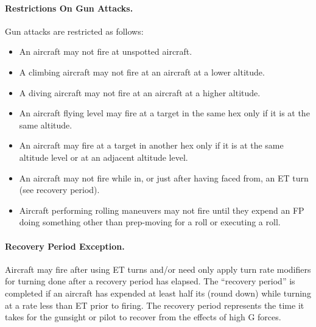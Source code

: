 \paragraph{Restrictions On Gun Attacks.} Gun attacks are restricted as follows:

\begin{itemize}
    \item An aircraft may not fire at unspotted aircraft.
    \item A climbing aircraft may not fire at an aircraft at a lower altitude.
    \item A diving aircraft may not fire at an aircraft at a higher altitude.
    \item An aircraft flying level may fire at a target in the same hex only if it is at the same altitude.
    \item An aircraft may fire at a target in another hex only if it is at the same altitude level or at an adjacent altitude level.
    \item An aircraft may not fire while in, or just after having faced from, an ET turn (see recovery period).
    \item Aircraft performing rolling maneuvers may not fire until they expend an FP doing something other than prep-moving for a roll or executing a roll.
\end{itemize}


\paragraph{Recovery Period Exception.} Aircraft may fire after using ET turns and/or need only apply turn rate modifiers for turning done after a recovery period has elapsed. The “recovery period” is completed if an aircraft has expended at least half its  (round down) while turning at a rate less than ET  prior to firing. The recovery period represents the time it takes for the gunsight or pilot to recover from the effects of high G forces.

